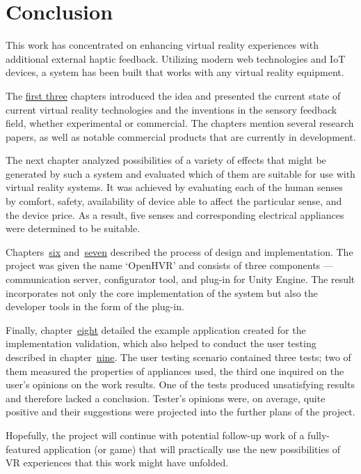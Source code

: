 \chapter{Conclusion}\label{conclusion}

This work has concentrated on enhancing virtual reality experiences with 
additional external haptic feedback. Utilizing modern web technologies and 
IoT devices, a system has been built that works with any virtual reality 
equipment.

The \hyperref[intro]{first three} chapters introduced the idea and presented the current state 
of current virtual reality technologies and the inventions in the sensory 
feedback field, whether experimental or commercial. The chapters mention 
several research papers, as well as notable commercial products that are 
currently in development.

The next chapter analyzed possibilities of a variety of effects that might 
be generated by such a system and evaluated which of them are suitable 
for use with virtual reality systems. It was achieved by evaluating each 
of the human senses by comfort, safety, availability of device able to affect 
the particular sense, and the device price. As a result, five senses 
and corresponding electrical appliances were determined to be suitable.

Chapters~\hyperref[design]{six} and~\hyperref[implementation]{seven} 
described the process of design and implementation. 
The project was given the name `OpenHVR' and consists of three 
components — communication server, configurator tool, and plug-in for Unity 
Engine. The result incorporates not only the core implementation of 
the system but also the developer tools in the form of the plug-in.

Finally, chapter~\hyperref[exampleapp]{eight} detailed the example application created 
for the implementation validation, which also helped to conduct the user 
testing described in chapter~\hyperref[usertesting]{nine}. 
The user testing scenario contained three tests; two of them measured 
the properties of appliances used, the third one inquired on the user's opinions
on the work results. One of the tests produced unsatisfying results 
and therefore lacked a conclusion. Tester's opinions were, on average, 
quite positive and their suggestions were projected into the 
further plans of the project.

Hopefully, the project will continue with potential follow-up work of a 
fully-featured application (or game) that will practically use the new 
possibilities of VR experiences that this work might have unfolded.